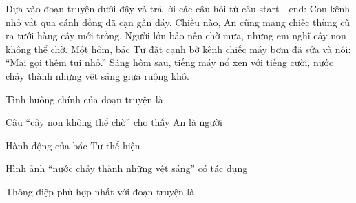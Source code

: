 \begin{baidoc}
\item[] Dựa vào đoạn truyện dưới đây và trả lời các câu hỏi từ câu {start} - {end}:
Con kênh nhỏ vắt qua cánh đồng đã cạn gần đáy. Chiều nào, An cũng mang chiếc thùng cũ ra tưới hàng cây mới trồng. Người lớn bảo nên chờ mưa, nhưng em nghĩ cây non không thể chờ. Một hôm, bác Tư đặt cạnh bờ kênh chiếc máy bơm đã sửa và nói: “Mai gọi thêm tụi nhỏ.” Sáng hôm sau, tiếng máy nổ xen với tiếng cười, nước chảy thành những vệt sáng giữa ruộng khô.

\begin{ex}
Tình huống chính của đoạn truyện là
\end{ex}

\begin{ex}
Câu “cây non không thể chờ” cho thấy An là người
\end{ex}

\begin{ex}
Hành động của bác Tư thể hiện
\end{ex}

\begin{ex}
Hình ảnh “nước chảy thành những vệt sáng” có tác dụng
\end{ex}

\begin{ex}
Thông điệp phù hợp nhất với đoạn truyện là
\end{ex}
\end{baidoc}

